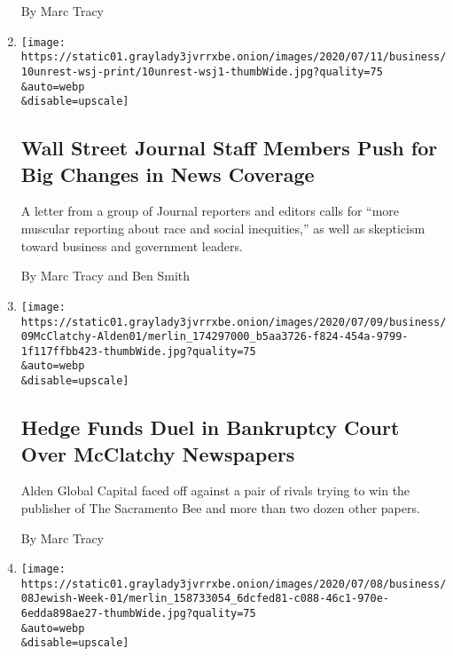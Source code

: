 \begin{enumerate}
  By Marc Tracy
\item
  \href{/2020/07/10/business/media/wall-street-journal-staff.html}{}

  \texttt{[image: https://static01.graylady3jvrrxbe.onion/images/2020/07/11/business/10unrest-wsj-print/10unrest-wsj1-thumbWide.jpg?quality=75\\\&auto=webp\\\&disable=upscale]}

  \hypertarget{wall-street-journal-staff-members-push-for-big-changes-in-news-coverage}{%
  \subsection{Wall Street Journal Staff Members Push for Big Changes in
  News
  Coverage}\label{wall-street-journal-staff-members-push-for-big-changes-in-news-coverage}}

  A letter from a group of Journal reporters and editors calls for
  ``more muscular reporting about race and social inequities,'' as well
  as skepticism toward business and government leaders.

  By Marc Tracy and Ben Smith
\item
  \href{/2020/07/09/business/media/mcclatchy-bankruptcy-chatham-alden.html}{}

  \texttt{[image: https://static01.graylady3jvrrxbe.onion/images/2020/07/09/business/09McClatchy-Alden01/merlin\_174297000\_b5aa3726-f824-454a-9799-1f117ffbb423-thumbWide.jpg?quality=75\\\&auto=webp\\\&disable=upscale]}

  \hypertarget{hedge-funds-duel-in-bankruptcy-court-over-mcclatchy-newspapers}{%
  \subsection{Hedge Funds Duel in Bankruptcy Court Over McClatchy
  Newspapers}\label{hedge-funds-duel-in-bankruptcy-court-over-mcclatchy-newspapers}}

  Alden Global Capital faced off against a pair of rivals trying to win
  the publisher of The Sacramento Bee and more than two dozen other
  papers.

  By Marc Tracy
\item
  \href{/2020/07/08/business/media/jewish-week-digital.html}{}

  \texttt{[image: https://static01.graylady3jvrrxbe.onion/images/2020/07/08/business/08Jewish-Week-01/merlin\_158733054\_6dcfed81-c088-46c1-970e-6edda898ae27-thumbWide.jpg?quality=75\\\&auto=webp\\\&disable=upscale]}

  \hypertarget{the-jewish-week-pauses-its-print-edition}{%
}
\end{enumerate}
